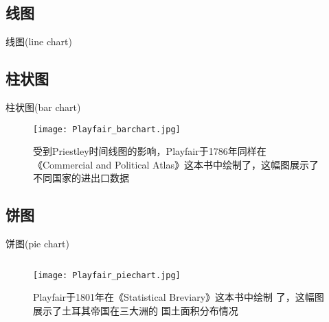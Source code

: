  \subsection{线图}

\begin{frame}[c]{线图(line chart)}{}
\begin{overlayarea}  {\textwidth}{\textheight}
   
\end{overlayarea}
\end{frame}

\subsection{柱状图}
\begin{frame}[c]{柱状图(bar chart)}{}
  \begin{figure}
    \centering
    \texttt{[image: Playfair\_barchart.jpg]}
    \caption{受到Priestley时间线图的影响，Playfair于1786年同样在
      《Commercial and Political Atlas》这本书中绘制了，这幅图展示了不同国家的进出口数据}
  \end{figure}
\end{frame}

\subsection{饼图}

\begin{frame}[c]{饼图(pie chart)}{}
  \begin{figure}
    \begin{columns}
      \begin{column}{.6\textwidth}
        \texttt{[image: Playfair\_piechart.jpg]}
      \end{column}

    \begin{column}{.35\textwidth}
      \centering
      \caption{Playfair于1801年在《Statistical Breviary》这本书中绘制
        了，这幅图展示了土耳其帝国在三大洲的
        国土面积分布情况}
    \end{column}
  \end{columns}
\end{figure}
\end{frame}

